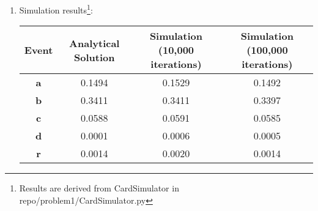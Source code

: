 {\begin{enumerate}
\begin{enumerate}
	Second draw: $ \frac{12}{51} $\\
	Third draw: $ \frac{11}{50} $\\
	Fourth draw: $ \frac{10}{49} $\\
	Fifth draw: $ \frac{9}{48} $\\
	
	Because these are independent events, we can multiply these probabilities together:
	\[ \frac{13}{52} \cdot \frac{12}{51} \cdot \frac{11}{50} \cdot \frac{10}{49} \approx 0.00018184\]
	
	So, the probability of drawing the first five cards as diamonds is approximately 0.00018184, or about 0.0182\%.
	
	\item \textbf{The first five cards form a full house}\\
	There are ${4 \choose 3} = 4$ different ways to choose 3 cards of the same type and ${4 \choose 2} = 6$ different ways to choose 2 cards of the same type. To get a full house, you need to first pick the type of the 3 of a kind, which is ${13 \choose 1} = 13$ different choices, and choose the type of the pair, which is ${12 \choose 1} = 12$ different choices. The order does not count, so there are ${13 \choose 1} \cdot {4 \choose 3} \cdot {12 \choose 1} \cdot {4 \choose 2}$ ways to have a full house.
	
	\[
	{13 \choose 1} \cdot {4 \choose 3} \cdot {12 \choose 1} \cdot {4 \choose 2} = 3744
	\]
	
	Note that there are ${52 \choose 5} = 2,598,960$ different combinations for the first 5 cards, so the probability of being dealt a full house is:
	
	\[
	\frac{3744}{2,598,960} \approx 0.14\%
	\]
	
	\end{enumerate}
	\item Simulation results\footnote{Results are derived from CardSimulator in repo/problem1/CardSimulator.py}:
	\begin{table}[H]
	    \centering 
	    \begin{tabular}{|c|c|c|c|} 
	        \hline
	        \textbf{Event} & \textbf{Analytical Solution} & \textbf{Simulation (10,000 iterations)} & \textbf{Simulation (100,000 iterations)}\\
	        \hline
	        \large \textbf{a} & \large 0.1494 & \large 0.1529 & \large 0.1492\\
	        \large \textbf{b} & \large 0.3411 & \large 0.3411 & \large 0.3397\\
	        \large \textbf{c} & \large 0.0588 & \large 0.0591 & \large 0.0585\\
	        \large \textbf{d} & \large 0.0001 & \large 0.0006 & \large 0.0005\\
	        \large \textbf{r} & \large 0.0014 & \large 0.0020 & \large 0.0014\\
	        \hline
	    \end{tabular}
	\end{table}
	\end{enumerate}
	}

